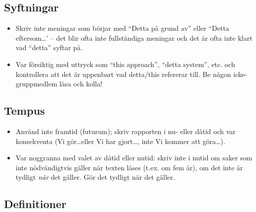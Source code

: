 \subsection*{Syftningar}

\begin{itemize}
\item    Skriv inte meningar som börjar med ``Detta på grund av'' eller ``Detta eftersom\ldots' -- det blir ofta inte fullständiga meningar och det är ofta inte klart vad ``detta'' syftar på.

\item    Var försiktig med uttryck som ``this approach'', ``detta system'', etc. och kontrollera att det är uppenbart vad detta/this refererar till. Be någon icke-gruppmedlem läsa och kolla!

\end{itemize}

\subsection*{Tempus}
\begin{itemize}
\item    Använd inte framtid (futurum);
  skriv rapporten i nu- eller dåtid och var konsekventa (Vi gör\ldots eller Vi har gjort\ldots, inte Vi kommer att göra\ldots). 

\item Var noggranna med valet av dåtid eller nutid: skriv inte i nutid om saker som inte nödvändigtvis gäller när texten läses (t.ex. om fem år), om det inte är tydligt \emph{när} det gäller. Gör det tydligt när det gäller.
\end{itemize}

\subsection*{Definitioner}

